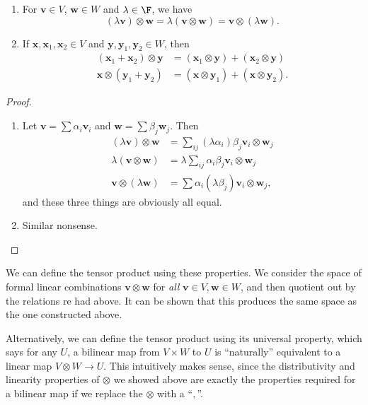 \documentclass[a4paper]{article}
\begin{document}
\begin{lemma}\leavevmode
  \begin{enumerate}
    \item For $\mathbf{v} \in V$, $\mathbf{w} \in W$ and $\lambda \in \F$, we have
      \[
        (\lambda \mathbf{v}) \otimes \mathbf{w} = \lambda (\mathbf{v} \otimes \mathbf{w}) = \mathbf{v} \otimes (\lambda \mathbf{w}).
      \]
    \item If $\mathbf{x}, \mathbf{x}_1, \mathbf{x}_2 \in V$ and $\mathbf{y}, \mathbf{y}_1, \mathbf{y}_2 \in W$, then
      \begin{align*}
        (\mathbf{x}_1 + \mathbf{x}_2) \otimes \mathbf{y} &= (\mathbf{x}_1 \otimes \mathbf{y}) + (\mathbf{x}_2 \otimes \mathbf{y})\\
        \mathbf{x}\otimes (\mathbf{y}_1 + \mathbf{y}_2) &= (\mathbf{x}\otimes \mathbf{y}_1) + (\mathbf{x} \otimes \mathbf{y}_2).
      \end{align*}
  \end{enumerate}
\end{lemma}

\begin{proof}\leavevmode
  \begin{enumerate}
    \item Let $\mathbf{v} = \sum \alpha_i \mathbf{v}_i$ and $\mathbf{w} = \sum \beta_j \mathbf{w}_j$. Then
      \begin{align*}
        (\lambda \mathbf{v}) \otimes \mathbf{w} &= \sum_{ij} (\lambda \alpha_i) \beta_j \mathbf{v}_i \otimes \mathbf{w}_j \\
        \lambda (\mathbf{v}\otimes \mathbf{w}) &= \lambda \sum_{ij} \alpha_i \beta_j \mathbf{v}_i \otimes \mathbf{w}_j\\
        \mathbf{v}\otimes (\lambda \mathbf{w}) &= \sum \alpha_i (\lambda \beta_j) \mathbf{v}_i \otimes \mathbf{w}_j,
      \end{align*}
      and these three things are obviously all equal.
    \item Similar nonsense.
  \end{enumerate}
\end{proof}
We can define the tensor product using these properties. We consider the space of formal linear combinations $\mathbf{v} \otimes \mathbf{w}$ for \emph{all} $\mathbf{v} \in V, \mathbf{w} \in W$, and then quotient out by the relations re had above. It can be shown that this produces the same space as the one constructed above.

Alternatively, we can define the tensor product using its universal property, which says for any $U$, a bilinear map from $V \times W$ to $U$ is ``naturally'' equivalent to a linear map $V \otimes W \to U$. This intuitively makes sense, since the distributivity and linearity properties of $\otimes$ we showed above are exactly the properties required for a bilinear map if we replace the $\otimes$ with a ``$,$''.
\end{document}
